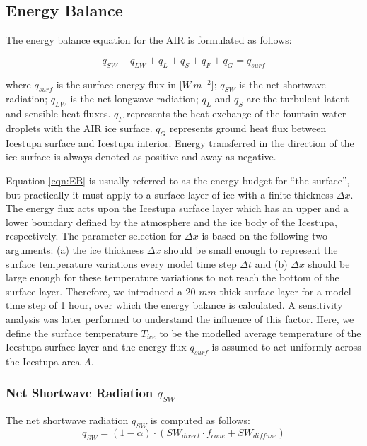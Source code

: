 \documentclass[utf8]{frontiersSCNS} %
\begin{document}
\subsection{Energy Balance} \label{section:EB}

The energy balance equation \citep{Hock_2005} for the AIR is formulated as follows:

\begin{equation} q_{SW} + q_{LW} + q_{L} + q_{S} + q_{F} + q_{G} = q_{surf} \label{eqn:EB} \end{equation}

where $q_{surf}$ is the surface energy flux in [$W\,m^{-2}$]; $q_{SW}$ is the net shortwave radiation; $q_{LW}$ is the
net longwave radiation; $q_{L}$ and $q_{S}$ are the turbulent latent and sensible heat fluxes. $q_{F}$ represents the heat
exchange of the fountain water droplets with the AIR ice surface. $q_{G}$ represents ground heat flux between Icestupa
surface and Icestupa interior. Energy transferred in the direction of the ice surface is always denoted as positive and
away as negative.  

Equation \ref{eqn:EB} is usually referred to as the energy budget for “the surface”, but practically it must apply to
a surface layer of ice with a finite thickness $\Delta x$. The energy flux acts upon the Icestupa surface layer which
has an upper and a lower boundary defined by the atmosphere and the ice body of the Icestupa, respectively. The
parameter selection for $\Delta x$ is based on the following two arguments: (a) the ice thickness $\Delta x$ should be
small enough to represent the surface temperature variations every model time step $\Delta t$ and (b) $\Delta x$ should
be large enough for these temperature variations to not reach the bottom of the surface layer.  Therefore, we introduced
a 20 $mm$ thick surface layer for a model time step of 1 hour, over which the energy balance is calculated. A
sensitivity analysis was later performed to understand the influence of this factor. Here, we define the surface
temperature $T_{ice}$ to be the modelled average temperature of the Icestupa surface layer and the energy flux $q_{surf}$
is assumed to act uniformly across the Icestupa area $A$.

\subsubsection{Net Shortwave Radiation \texorpdfstring{$q_{SW}$}{Lg}} 
The net shortwave radiation $q_{SW}$ is computed as follows:
\begin{equation} q_{SW} = (1- \alpha)\cdot (SW_{direct} \cdot f_{cone} + SW_{diffuse}) \label{eqn:SW} \end{equation}
\end{document}
